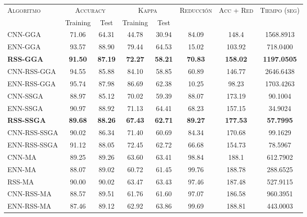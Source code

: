 \begin{table}[h!]
\centering
\begin{adjustbox}{max width =\textwidth}
\begin{tabular}{l c c c c c c c}
\hline
\multirow{2}{*}{\textsc{Algoritmo}}
	& \multicolumn{2}{c}{\textsc{Accuracy}}
	& \multicolumn{2}{c}{\textsc{Kappa}}
	& \textsc{Reducción}
	& \textsc{Acc + Red}
	& \textsc{Tiempo (seg)} \\
	& Training & Test
	& Training & Test \\ 
\hline
\hline

CNN-GGA     & 71.06 & 64.31 & 44.78 & 30.94 & 84.09 & 148.4 & 1568.8913 \\
ENN-GGA     & 93.57 & 88.90 & 79.44 & 64.53 & 15.02 & 103.92 & 718.0400 \\
\textbf{RSS-GGA}     & \textbf{91.50} & \textbf{87.19} & \textbf{72.27} & \textbf{58.21} & \textbf{70.83} & \textbf{158.02} & \textbf{1197.0505} \\
CNN-RSS-GGA & 94.55 & 85.88 & 84.10 & 58.85 & 60.89 & 146.77 & 2646.6438 \\
ENN-RSS-GGA & 95.74 & 87.98 & 86.69 & 62.38 & 10.25 & 98.23 & 1703.4263 \\

\hline

CNN-SSGA & 88.97 & 85.12 & 70.02 & 59.39 & 88.07 & 173.19 & 90.1004 \\
ENN-SSGA & 90.97 & 88.92 & 71.13 & 64.41 & 68.23 & 157.15 & 34.9024 \\
\textbf{RSS-SSGA} & \textbf{89.68} & \textbf{88.26} & \textbf{67.43} & \textbf{62.71} & \textbf{89.27} & \textbf{177.53} & \textbf{57.7995} \\
CNN-RSS-SSGA & 90.02 & 86.34 & 71.40 & 60.69 & 84.34 & 170.68 & 99.1629 \\
ENN-RSS-SSGA & 91.12 & 88.05 & 72.45 & 62.72 & 66.68 & 154.73 & 78.5967 \\

\hline

CNN-MA & 89.25 & 89.26 & 63.60 & 63.41 & 98.84 & 188.1 & 612.7902 \\
ENN-MA & 88.07 & 89.02 & 60.72 & 61.45 & 99.76 & 188.78 & 288.6525 \\
RSS-MA & 90.00 & 90.02 & 63.47 & 63.43 & 97.46 & 187.48 & 527.9115 \\
CNN-RSS-MA & 88.57 & 89.51 & 61.76 & 61.60 & 97.07 & 186.58 & 960.3951 \\
ENN-RSS-MA & 87.46 & 89.12 & 62.92 & 63.86 & 99.69 & 188.81 & 443.0003 \\


\end{tabular}
\end{adjustbox}
\end{table}
